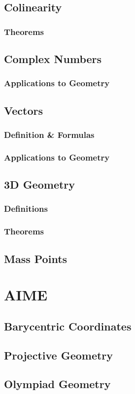\documentclass[11pt]{article}
\begin{document}
\subsection{Colinearity}
\subsubsection*{Theorems}
\subsection{Complex Numbers}
\subsubsection*{Applications to Geometry}
\subsection{Vectors}
\subsubsection*{Definition \& Formulas}
\subsubsection*{Applications to Geometry}
\subsection{3D Geometry}
\subsubsection*{Definitions}
\subsubsection*{Theorems}
\subsection{Mass Points}
\section{AIME}
\subsection{Barycentric Coordinates}
\subsection{Projective Geometry}
\subsection{Olympiad Geometry}
\end{document}
